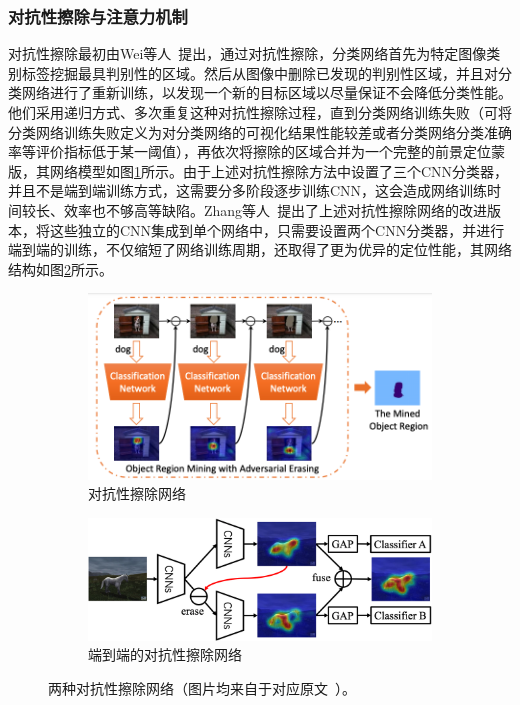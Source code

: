 \subsubsection*{对抗性擦除与注意力机制}
对抗性擦除最初由Wei等人~\cite{WeiFLCZY17}提出，通过对抗性擦除，分类网络首先为特定图像类别标签挖掘最具判别性的区域。然后从图像中删除已发现的判别性区域，并且对分类网络进行了重新训练，以发现一个新的目标区域以尽量保证不会降低分类性能。他们采用递归方式、多次重复这种对抗性擦除过程，直到分类网络训练失败（可将分类网络训练失败定义为对分类网络的可视化结果性能较差或者分类网络分类准确率等评价指标低于某一阈值），再依次将擦除的区域合并为一个完整的前景定位蒙版，其网络模型如图\ref{subfig:adversarial_erasing}所示。由于上述对抗性擦除方法中设置了三个CNN分类器，并且不是端到端训练方式，这需要分多阶段逐步训练CNN，这会造成网络训练时间较长、效率也不够高等缺陷。Zhang等人~\cite{ZhangWF0H18}提出了上述对抗性擦除网络的改进版本，将这些独立的CNN集成到单个网络中，只需要设置两个CNN分类器，并进行端到端的训练，不仅缩短了网络训练周期，还取得了更为优异的定位性能，其网络结构如图\ref{subfig:improved_adversarial_learning}所示。

\begin{figure}[h!]
	\centering
	\begin{subfigure}{0.38\textwidth}
		\centering
		\includegraphics[width=1.0\textwidth]{figure/adversarial_erasing}
        \caption{对抗性擦除网络~\cite{WeiFLCZY17}}
		\label{subfig:adversarial_erasing}
	\end{subfigure}
	\begin{subfigure}{0.57\textwidth}
		\centering
		\includegraphics[width=1.0\textwidth]{figure/improved_adversarial_learning}
		\caption{端到端的对抗性擦除网络~\cite{ZhangWF0H18}}
		\label{subfig:improved_adversarial_learning}
	\end{subfigure}
	\caption[两种对抗性擦除网络]{两种对抗性擦除网络（图片均来自于对应原文~\cite{WeiFLCZY17,ZhangWF0H18}）。}
	\label{mul_fig:weakly_supervised_localization}
\end{figure}

